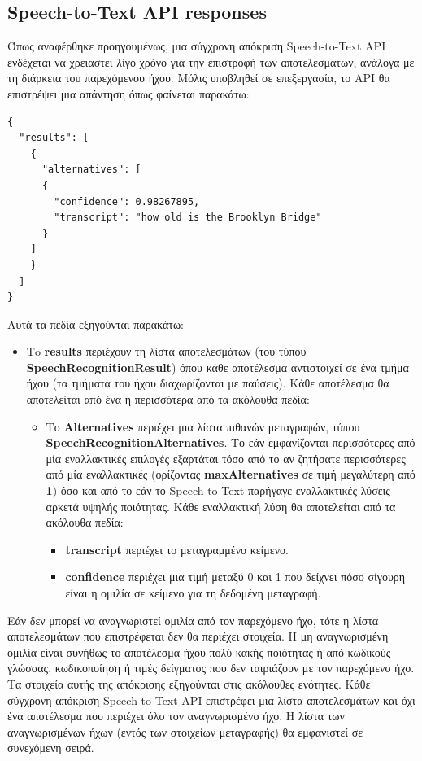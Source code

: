 \documentclass[oneside, 12pt]{book}
\begin{document}
\subsection{Speech-to-Text API responses}\label{subsec:speech-to-text-api-responses}
Όπως αναφέρθηκε προηγουμένως, μια σύγχρονη απόκριση Speech-to-Text API ενδέχεται να χρειαστεί λίγο χρόνο για την επιστροφή των αποτελεσμάτων, ανάλογα με τη διάρκεια του παρεχόμενου ήχου. Μόλις υποβληθεί σε επεξεργασία, το API θα επιστρέψει μια απάντηση όπως φαίνεται παρακάτω:
\begin{lstlisting}
{
  "results": [
    {
      "alternatives": [
      {
        "confidence": 0.98267895,
        "transcript": "how old is the Brooklyn Bridge"
      }
    ]
    }
  ]
}
\end{lstlisting}
Αυτά τα πεδία εξηγούνται παρακάτω:
\begin{itemize}
  \item Τo \textbf{results} περιέχουν τη λίστα αποτελεσμάτων (του τύπου \textbf{SpeechRecognitionResult}) όπου κάθε αποτέλεσμα αντιστοιχεί σε ένα τμήμα ήχου (τα τμήματα του ήχου διαχωρίζονται με παύσεις). Κάθε αποτέλεσμα θα αποτελείται από ένα ή περισσότερα από τα ακόλουθα πεδία:
  \begin{itemize}
    \item Το \textbf{Alternatives} περιέχει μια λίστα πιθανών μεταγραφών, τύπου \newline\textbf{SpeechRecognitionAlternatives}. Το εάν εμφανίζονται περισσότερες από μία εναλλακτικές επιλογές εξαρτάται τόσο από το αν ζητήσατε περισσότερες από μία εναλλακτικές (ορίζοντας \textbf{maxAlternatives} σε τιμή μεγαλύτερη από \textbf{1}) όσο και από το εάν το Speech-to-Text παρήγαγε εναλλακτικές λύσεις αρκετά υψηλής ποιότητας. Κάθε εναλλακτική λύση θα αποτελείται από τα ακόλουθα πεδία:
    \begin{itemize}
      \item \textbf{transcript} περιέχει το μεταγραμμένο κείμενο.
      \item \textbf{confidence} περιέχει μια τιμή μεταξύ 0 και 1 που δείχνει πόσο σίγουρη είναι η ομιλία σε κείμενο για τη δεδομένη μεταγραφή.
    \end{itemize}
  \end{itemize}
\end{itemize}
Εάν δεν μπορεί να αναγνωριστεί ομιλία από τον παρεχόμενο ήχο, τότε η λίστα αποτελεσμάτων που επιστρέφεται δεν θα περιέχει στοιχεία. Η μη αναγνωρισμένη ομιλία είναι συνήθως το αποτέλεσμα ήχου πολύ κακής ποιότητας ή από κωδικούς γλώσσας, κωδικοποίηση ή τιμές δείγματος που δεν ταιριάζουν με τον παρεχόμενο ήχο.
Τα στοιχεία αυτής της απόκρισης εξηγούνται στις ακόλουθες ενότητες.
Κάθε σύγχρονη απόκριση Speech-to-Text API επιστρέφει μια λίστα αποτελεσμάτων και όχι ένα αποτέλεσμα που περιέχει όλο τον αναγνωρισμένο ήχο. Η λίστα των αναγνωρισμένων ήχων (εντός των στοιχείων μεταγραφής) θα εμφανιστεί σε συνεχόμενη σειρά.
\end{document}
